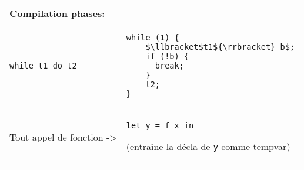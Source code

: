 \documentclass[class=scrartcl,border={0cm 1.5cm 1cm -0.5cm},multi={tabular}]{standalone}
\theoremstyle{break}
\begin{document}
\begin{tabular}{p{10cm}p{10cm}}
  \toprule
  \textbf{Compilation phases:} & \\
\begin{lstlisting}
while t1 do t2
\end{lstlisting} &
\begin{lstlisting}[mathescape=true]
while (1) {
    $\llbracket$t1${\rrbracket}_b$;
    if (!b) {
      break;
    }
    t2;
}
\end{lstlisting} \\
  Tout appel de fonction -> &
\begin{lstlisting}
let y = f x in
\end{lstlisting}
(entraîne la décla de \texttt{y} comme tempvar) \\
  \bottomrule
\end{tabular}
\end{document}
